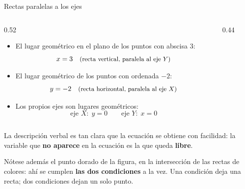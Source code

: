 \documentclass[aspectratio=169,10pt]{beamer}
\newcommand{\destaca}[1]{%
  \par\vspace{3pt}\noindent
  \colorbox{turquesaClaro}{%
    \parbox{\dimexpr\linewidth-2\fboxsep\relax}{\vspace{3pt}#1\vspace{3pt}}}%
  \par\vspace{3pt}}
\begin{document}
\begin{frame}{Rectas paralelas a los ejes}
  \begin{columns}[T]
    \begin{column}{0.52\textwidth}
      \begin{itemize}
        \item El lugar geométrico en el plano de los puntos con abscisa $3$:
          \[
            x=3 \quad\text{\small (recta vertical, paralela al eje $Y$)}
          \]
        \item El lugar geométrico de los puntos con ordenada $-2$:
          \[
            y=-2 \quad\text{\small (recta horizontal, paralela al eje $X$)}
          \]
        \item Los propios ejes son lugares geométricos:
          \[
            \text{eje } X:\; y=0 \qquad \text{eje } Y:\; x=0
          \]
      \end{itemize}
    \end{column}
    \begin{column}{0.44\textwidth}
      \begin{center}
      \end{center}
    \end{column}
  \end{columns}

  \vspace{0.15cm}
  \destaca{\small La descripción verbal es tan clara que la ecuación
  se obtiene con facilidad: la variable que \textbf{no aparece} en la
  ecuación es la que queda \textbf{libre}.

  \vspace{0.1cm}
  Nótese además el punto dorado de la figura, en la intersección de
  las rectas de colores: ahí se cumplen \textbf{las dos condiciones} a
  la vez. Una condición deja una recta; dos condiciones dejan un solo
  punto.}
\end{frame}
\end{document}
